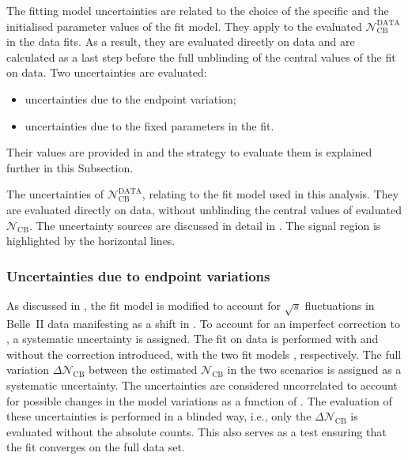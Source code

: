 The \Mbc fitting model uncertainties are related to the choice of the specific  
and the initialised parameter values of the fit model.
They apply to the evaluated $\mathcal{N}^{\mathrm{DATA}}_{\mathrm{CB}}$ in the data fits.
As a result, they are evaluated directly on data and are calculated as a last step
before the full unblinding of the central values of the \Mbc fit on data.
Two uncertainties are evaluated:
\begin{itemize}
    \item uncertainties due to the \Mbc endpoint variation;
    \item uncertainties due to the fixed parameters in the \Mbc fit.
\end{itemize}
Their values are provided in  and the strategy to evaluate them is explained further in this Subsection.

\begin{table}[hbtp!]
    \centering
    \caption{\label{tab:fit_uncertainties} 
    The uncertainties of $\mathcal{N}^{\mathrm{DATA}}_{\mathrm{CB}}$, relating to the \Mbc fit model used in this analysis.
    They are evaluated directly on data, without unblinding the central values of evaluated $\mathcal{N}_{\mathrm{CB}}$.
    The uncertainty sources are discussed in detail in .
    The signal region is highlighted by the horizontal lines.
    }
    
\end{table}

\subsubsection{Uncertainties due to \texorpdfstring{\Mbc}{Mbc} endpoint variations}\label{sec:fit_endpoint_systematic}

As discussed in , the fit model is modified to account for $\sqrt{s}$ fluctuations in Belle~II data manifesting as a shift in \Mbc.
To account for an imperfect correction to \MC, a systematic uncertainty is assigned.
The fit on data is performed with and without the \Mbc correction introduced, with the two fit models , respectively.
The full variation $\Delta\mathcal{N}_{\mathrm{CB}}$ between the estimated $\mathcal{N}_{\mathrm{CB}}$ in the two scenarios is assigned as a systematic uncertainty.
The uncertainties are considered uncorrelated to account for possible changes in the model variations as a function of \EB.
The evaluation of these uncertainties is performed in a blinded way, i.e., only the $\Delta\mathcal{N}_{\mathrm{CB}}$ is evaluated without the absolute counts.
This also serves as a test ensuring that the fit converges on the full data set.

